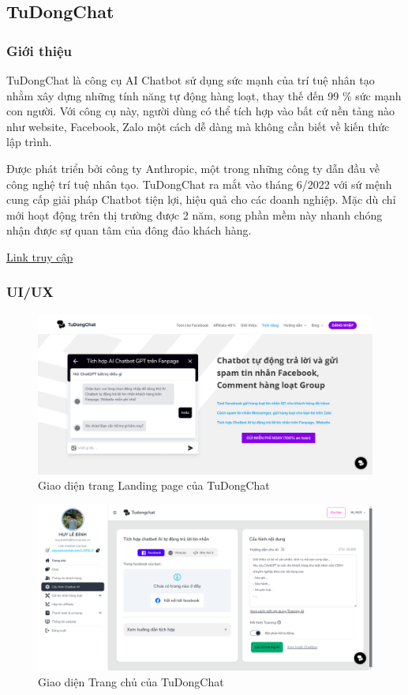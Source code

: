 \subsection{TuDongChat}
\subsubsection{Giới thiệu}
TuDongChat là công cụ AI Chatbot sử dụng sức mạnh của trí tuệ nhân tạo nhằm xây dựng những tính năng tự động hàng loạt, thay thế đến 99
\% sức mạnh con người. Với công cụ này, người dùng có thể tích hợp vào bất cứ nền tảng nào như website, Facebook, Zalo một cách dễ dàng mà không cần biết về kiến thức lập trình.


Được phát triển bởi công ty Anthropic, một trong những công ty dẫn đầu về công nghệ trí tuệ nhân tạo. TuDongChat ra mắt vào tháng 6/2022 với sứ mệnh cung cấp giải pháp Chatbot tiện lợi, hiệu quả cho các doanh nghiệp. Mặc dù chỉ mới hoạt động trên thị trường được 2 năm, song phần mềm này nhanh chóng nhận được sự quan tâm của đông đảo khách hàng.

\href{https://tudongchat.com/}{Link truy cập}
\subsubsection{UI/UX}
\begin{figure}[H]
    \centering
    \includegraphics[width=1\linewidth]{Images/uiTuDongChat.png}
    \vspace{0.5cm}
    \caption{Giao diện trang Landing page của TuDongChat}
    \label{fig:enter-label}
\end{figure}

\begin{figure}[H]
    \centering
    \includegraphics[width=1\linewidth]{Images/uiTuDongChat2.png}
    \vspace{0.5cm}
    \caption{Giao diện Trang chủ của TuDongChat}
    \label{fig:enter-label}
\end{figure}

